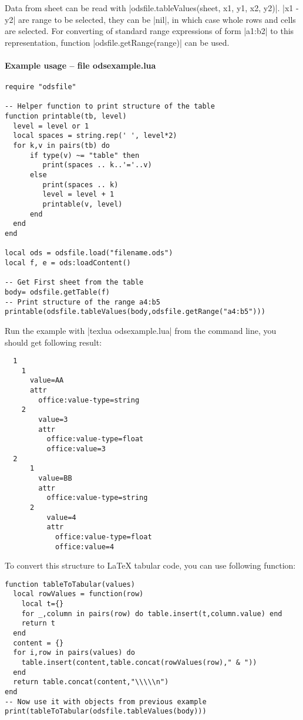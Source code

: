 \documentclass{ltxdoc}
\begin{document}
Data from sheet can be read with |odsfile.tableValues(sheet, x1, y1, x2, y2)|. |x1 - y2| are range to be selected, they can be |nil|, in which case whole rows and cells are selected. For converting of standard range expressions of form |a1:b2| to this representation, function |odsfile.getRange(range)| can be used.

\paragraph{Example usage -- file \textsf{odsexample.lua}}

\begin{verbatim}
require "odsfile"

-- Helper function to print structure of the table
function printable(tb, level)
  level = level or 1
  local spaces = string.rep(' ', level*2)
  for k,v in pairs(tb) do
      if type(v) ~= "table" then
         print(spaces .. k..'='..v)
      else
         print(spaces .. k)
         level = level + 1
         printable(v, level)
      end
  end
end

local ods = odsfile.load("filename.ods")
local f, e = ods:loadContent()

-- Get First sheet from the table
body= odsfile.getTable(f)
-- Print structure of the range a4:b5  
printable(odsfile.tableValues(body,odsfile.getRange("a4:b5")))
\end{verbatim}

Run the example with |texlua odsexample.lua| from the command line, you should get following result:

\begin{verbatim}
  1
    1
      value=AA
      attr
        office:value-type=string
    2
        value=3
        attr
          office:value-type=float
          office:value=3
  2
      1
        value=BB
        attr
          office:value-type=string
      2
          value=4
          attr
            office:value-type=float
            office:value=4
\end{verbatim}

To convert this structure to \LaTeX{} tabular code, you can use following function:

\begin{verbatim}
function tableToTabular(values)
  local rowValues = function(row)
    local t={} 
    for _,column in pairs(row) do table.insert(t,column.value) end
    return t
  end
  content = {}   
  for i,row in pairs(values) do
    table.insert(content,table.concat(rowValues(row)," & "))
  end
  return table.concat(content,"\\\\\n")
end
-- Now use it with objects from previous example
print(tableToTabular(odsfile.tableValues(body)))
\end{verbatim}  
\end{document}
